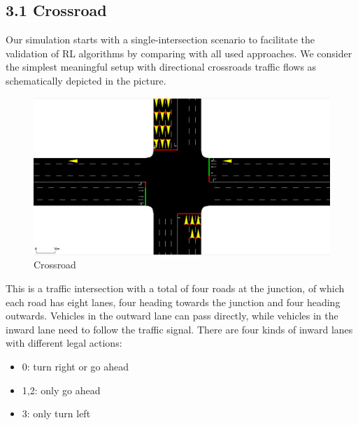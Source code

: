 \documentclass[letterpaper]{article} %
\begin{document}
\subsection{3.1 Crossroad}
\hspace*{1em}Our simulation starts with a single-intersection scenario to facilitate the validation of RL algorithms by comparing with all used approaches. We consider the simplest meaningful setup with directional crossroads traffic flows as schematically depicted in the picture.
\begin{figure}[h]
	\centering
	\includegraphics[width=0.9\linewidth, frame]{crossroad}
	\caption{Crossroad}
	\label{fig:crossroad}
\end{figure}
\newline
\hspace*{1em}This is a traffic intersection with a total of four roads at the junction, of which each road has eight lanes, four heading towards the junction and four heading outwards. Vehicles in the outward lane can pass directly, while vehicles in the inward lane need to follow the traffic signal. There are four kinds of inward lanes with different legal actions:
\begin{itemize}
	\item 0: turn right or go ahead
	\item 1,2: only go ahead
	\item 3: only turn left
\end{itemize}
\end{document}
